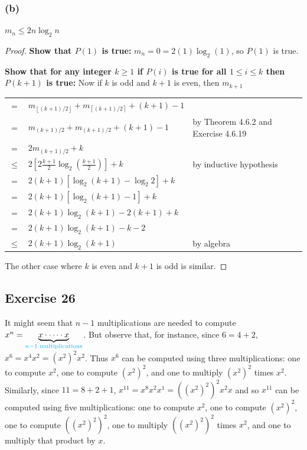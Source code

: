\documentclass[14pt]{extarticle}
\newcommand{\cy}{\color{cyan}}
\newcommand{\floor}[1]{{\left\lfloor#1\right\rfloor}}
\newcommand{\ceil}[1]{{\left\lceil#1\right\rceil}}
\begin{document}
\subsubsection{(b)}
\(m_n \leq 2n \log_2 n\)
\begin{proof}
    {\bf Show that \(P(1)\) is true:} \(m_n = 0 = 2(1) \log_2(1)\), so \(P(1)\) is true.

        {\bf Show that for any integer \(k \geq 1\) if \(P(i)\) is true for all \(1 \leq i \leq k\) then \(P(k+1)\) is true:}
    Now if \(k\) is odd and \(k+1\) is even, then \(m_{k+1}\)

    \begin{tabular}{cll}
        =        & \(m_{\floor{(k+1)/2}} + m_{\ceil{(k+1)/2}} + (k+1) - 1\)   &                                            \\
        =        & \(m_{(k+1)/2} + m_{(k+1)/2} + (k+1) - 1\)                  & {\cy by Theorem 4.6.2 and Exercise 4.6.19} \\
        =        & \(2m_{(k+1)/2} + k\)                                       &                                            \\
        \(\leq\) & \(2[2\frac{k+1}{2} \log_2\left(\frac{k+1}{2}\right)] + k\) & {\cy by inductive hypothesis}              \\
        =        & \(2(k+1)[\log_2(k+1) - \log_2 2] + k\)                     &                                            \\
        =        & \(2(k+1)[\log_2(k+1) - 1] + k\)                            &                                            \\
        =        & \(2(k+1)\log_2(k+1) - 2(k+1) + k\)                         &                                            \\
        =        & \(2(k+1)\log_2(k+1) - k - 2\)                              &                                            \\
        \(\leq\) & \(2(k+1)\log_2(k+1)\)                                      & {\cy by algebra}                           \\
    \end{tabular}

    The other case where \(k\) is even and \(k+1\) is odd is similar.
\end{proof}

\subsection{Exercise 26}
It might seem that \(n - 1\) multiplications are needed to compute \(x^n = \underbrace{x \cdot \cdots \cdot x}_{\cy n - 1
\text{ multiplications}}\). But observe that, for instance, since \(6 = 4 + 2\), \(x^6 = x^4x^2 = (x^2)^2x^2\). Thus
\(x^6\) can be computed using three multiplications: one to compute \(x^2\), one to compute \((x^2)^2\), and one to
multiply \((x^2)^2\) times \(x^2\). Similarly, since \(11 = 8 + 2 + 1\), \(x^{11} = x^8 x^2 x^1 = ((x^2)^2)^2x^2x\) and so
\(x^{11}\) can be computed using five multiplications: one to compute \(x^2\), one to compute \((x^2)^2\), one to compute
\(((x^2)^2)^2\), one to multiply \(((x^2)^2)^2\) times \(x^2\), and one to multiply that product by \(x\).
\end{document}

